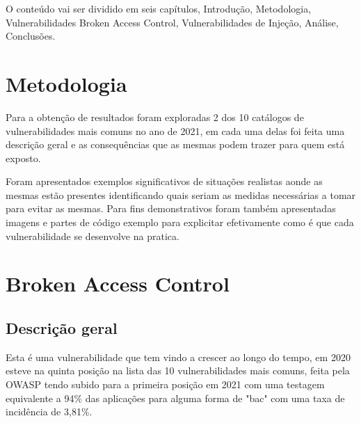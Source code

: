\documentclass{report}
\begin{document}
O conteúdo vai ser dividido em seis capítulos, Introdução, Metodologia, Vulnerabilidades Broken Access Control, Vulnerabilidades de Injeção, Análise, Conclusões.
\chapter{Metodologia}
\label{chap.metodologia}
Para a obtenção de resultados foram exploradas 2 dos 10 catálogos de  vulnerabilidades mais comuns no ano de 2021, em cada uma delas foi feita uma descrição geral e as consequências que as mesmas podem trazer para quem está exposto. 

Foram apresentados exemplos significativos de situações realistas aonde as mesmas estão presentes identificando quais seriam as medidas necessárias a tomar para evitar as mesmas. Para fins demonstrativos foram também apresentadas imagens e partes de código exemplo para explicitar efetivamente como é que cada vulnerabilidade se desenvolve na pratica.




\chapter{ Broken Access Control}
\clearpage
\label{chap.bac}
\section{Descrição geral}

Esta é uma vulnerabilidade que tem vindo a crescer ao longo do tempo, em 2020 esteve na quinta posição na lista das 10 vulnerabilidades mais comuns, feita pela OWASP tendo subido para a primeira posição em 2021 com uma testagem equivalente a 94\% das aplicações para alguma forma de "\ac{bac}" com uma taxa de incidência de 3,81\%.\cite{owasptop10}
\end{document}
